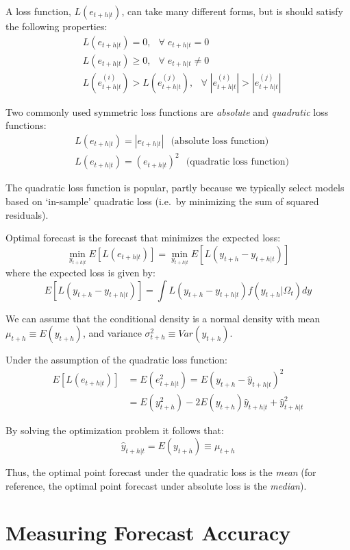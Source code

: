 \documentclass[
  oneside]{book}
\begin{document}
A loss function, \(L(e_{t+h|t})\), can take many different forms, but is should satisfy the following properties:
\[\begin{aligned}
        & L(e_{t+h|t}) = 0,\;~~\forall\;e_{t+h|t} = 0 \\
        & L(e_{t+h|t}) \geq 0,\;~~\forall\;e_{t+h|t} \neq 0 \\
        & L(e_{t+h|t}^{(i)}) > L(e_{t+h|t}^{(j)}),\;~~\forall\;|e_{t+h|t}^{(i)}| > |e_{t+h|t}^{(j)}|
        \end{aligned}\]

Two commonly used symmetric loss functions are \emph{absolute} and \emph{quadratic} loss functions:
\[\begin{aligned}
        & L{(e_{t+h|t})} = |e_{t+h|t}|\;~~\text{(absolute loss function)} \\
        & L{(e_{t+h|t})} = (e_{t+h|t})^2\;~~\text{(quadratic loss function)}
        \end{aligned}\]

The quadratic loss function is popular, partly because we typically select models based on `in-sample' quadratic loss (i.e.~by minimizing the sum of squared residuals).

Optimal forecast is the forecast that minimizes the expected loss:
\[\min_{y_{t+h|t}} E\left[L\left(e_{t+h|t}\right)\right] = \min_{y_{t+h|t}} E\left[L\left(y_{t+h}-y_{t+h|t}\right)\right]\]
where the expected loss is given by:
\[E\left[L\left(y_{t+h}-y_{t+h|t}\right)\right]=\int L\left(y_{t+h}-y_{t+h|t}\right) f(y_{t+h}|\Omega_t)dy\]

We can assume that the conditional density is a normal density with mean \(\mu_{t+h} \equiv E(y_{t+h})\), and variance \(\sigma_{t+h}^2 \equiv Var(y_{t+h})\).

Under the assumption of the quadratic loss function:
\[\begin{aligned}
        E\left[L(e_{t+h|t})\right] & = E(e_{t+h|t}^2) = E(y_{t+h} - \hat{y}_{t+h|t})^2 \\
        & = E(y_{t+h}^2)-2E(y_{t+h})\hat{y}_{t+h|t} + \hat{y}_{t+h|t}^2
        \end{aligned}\]

By solving the optimization problem it follows that: \[\hat{y}_{t+h|t} = E(y_{t+h}) \equiv \mu_{t+h}\]

Thus, the optimal point forecast under the quadratic loss is the \emph{mean} (for reference, the optimal point forecast under absolute loss is the \emph{median}).

\hypertarget{measuring-forecast-accuracy}{%
\section{Measuring Forecast Accuracy}\label{measuring-forecast-accuracy}}
\end{document}
